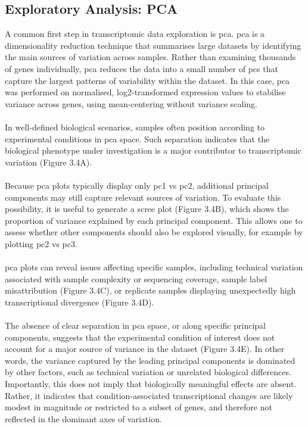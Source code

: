 \subsection{Exploratory Analysis: PCA}

A common first step in transcriptomic data exploration is \gls{pca}. \gls{pca} is a dimensionality reduction technique that summarises large datasets by identifying the main sources of variation across samples. Rather than examining thousands of genes individually, \gls{pca} reduces the data into a small number of \glspl{pc} that capture the largest patterns of variability within the dataset. In this case, \gls{pca} was performed on normalised, log2-transformed expression values to stabilise variance across genes, using mean-centering without variance scaling.
\\
\\
In well-defined biological scenarios, samples often position according to experimental conditions in \gls{pca} space. Such separation indicates that the biological phenotype under investigation is a major contributor to transcriptomic variation (Figure 3.4A).
\\
\\
Because \gls{pca} plots typically display only \gls{pc}1 \gls{vs} \gls{pc}2, additional principal components may still capture relevant sources of variation. To evaluate this possibility, it is useful to generate a scree plot (Figure 3.4B), which shows the proportion of variance explained by each principal component. This allows one to assess whether other components should also be explored visually, for example by plotting \gls{pc}2 \gls{vs} \gls{pc}3.
\\
\\
\Gls{pca} plots can reveal issues affecting specific samples, including technical variation associated with sample complexity or sequencing coverage, sample label misattribution (Figure 3.4C), or replicate samples displaying unexpectedly high transcriptional divergence (Figure 3.4D).
\\
\\
The absence of clear separation in \gls{pca} space, or along specific principal components, suggests that the experimental condition of interest does not account for a major source of variance in the dataset (Figure 3.4E). In other words, the variance captured by the leading principal components is dominated by other factors, such as technical variation or unrelated biological differences. Importantly, this does not imply that biologically meaningful effects are absent. Rather, it indicates that condition-associated transcriptional changes are likely modest in magnitude or restricted to a subset of genes, and therefore not reflected in the dominant axes of variation.

